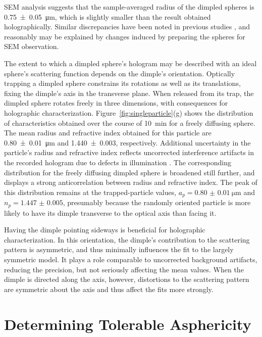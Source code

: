 SEM analysis suggests that the sample-averaged radius of the
dimpled spheres is \SI{0.75(5)}{\um}, which is slightly smaller
than the result obtained holographically.
Similar discrepancies have been noted in previous studies
\cite{yamada85,*cermola87},
and reasonably may be explained by changes
induced by preparing the spheres for SEM observation.



The extent to which a dimpled sphere's hologram may be described
with an ideal sphere's scattering function depends on the dimple's
orientation.
Optically trapping a dimpled sphere constrains its rotations 
as well as its translations, fixing the dimple's axis in the
transverse plane.
When released from its trap, the dimpled sphere rotates freely in three
dimensions, with consequences for holographic characterization.
Figure~\ref{fig:singleparticle}(g) shows the distribution of characteristics
obtained over the course of \SI{10}{\minute} for a freely diffusing
sphere.
The mean radius and refractive index obtained for this particle are
\SI{0.80(1)}{\um} and \num{1.440(3)}, respectively.
Additional uncertainty in the particle's radius and refractive index
reflects uncorrected interference artifacts in the recorded hologram due
to defects in illumination \cite{krishnatreya14}.
The corresponding distribution for the freely diffusing dimpled sphere
is broadened still further, and displays a strong anticorrelation between
radius and refractive index.
The peak of this distribution remains at the trapped-particle values,
$a_p = \SI{0.80(1)}{\um}$ and $n_p = \num{1.447(5)}$,
presumably because the randomly oriented particle is more likely 
to have its dimple transverse to the optical axis than facing it.

Having the dimple pointing sideways is beneficial for holographic
characterization.  In this orientation, the dimple's contribution to the 
scattering pattern is asymmetric, and thus minimally influences the
fit to the largely symmetric model.  It plays a role comparable to
uncorrected background artifacts, reducing the precision, but not
seriously affecting the mean values.
When the dimple is directed along the axis, however, distortions to
the scattering pattern are symmetric about the axis and thus affect
the fits more strongly.

\section{Determining Tolerable Asphericity}


